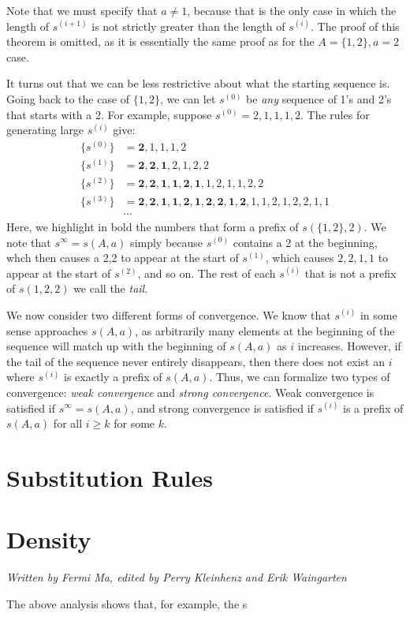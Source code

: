 \documentclass[runningheads,a4paper]{llncs}
\begin{document}
Note that we must specify that $a \neq 1$, because that is the only case in which the length of $s^{(i+1)}$ is not strictly greater than the length of $s^{(i)}$. The proof of this theorem is omitted, as it is essentially the same proof as for the $A = \{1,2\}, a = 2$ case.

It turns out that we can be less restrictive about what the starting sequence is. Going back to the case of $\{1,2\}$, we can let $s^{(0)}$ be \emph{any} sequence of 1's and 2's that starts with a 2. For example, suppose $s^{(0)} = 2,1,1,1,2$. The rules for generating large $s^{(i)}$ give:
\begin{align*}
\{s^{(0)}\} &= \mathbf{2},1,1,1,2\\
\{s^{(1)}\} &= \mathbf{2,2,1},2,1,2,2\\
\{s^{(2)}\} &= \mathbf{2,2,1,1,2,1},1,2,1,1,2,2\\
\{s^{(3)}\} &= \mathbf{2,2,1,1,2,1,2,2,1,2},1,1,2,1,2,2,1,1\\
&\cdots
\end{align*}
Here, we highlight in bold the numbers that form a prefix of $s(\{1,2\},2)$. We note that $s^\infty = s(A,a)$ simply because $s^{(0)}$ contains a 2 at the beginning, whch then causes a 2,2 to appear at the start of $s^{(1)}$, which causes $2,2,1,1$ to appear at the start of $s^{(2)}$, and so on. The rest of each $s^{(i)}$ that is not a prefix of $s({1,2},2)$ we call the \emph{tail}.

We now consider two different forms of convergence. We know that $s^{(i)}$ in some sense approaches $s(A,a)$, as arbitrarily many elements at the beginning of the sequence will match up with the beginning of $s(A,a)$ as $i$ increases. However, if the tail of the sequence never entirely disappears, then there does not exist an $i$ where $s^{(i)}$ is exactly a prefix of $s(A,a)$. Thus, we can formalize two types of convergence: \emph{weak convergence} and \emph{strong convergence}. Weak convergence is satisfied if $s^\infty = s(A,a)$, and strong convergence is satisfied if $s^{(i)}$ is a prefix of $s(A,a)$ for all $i \geq k$ for some $k$.

\section{Substitution Rules}
\label{substitutionrules}

\section{Density}
\label{density}

\emph{Written by Fermi Ma, edited by Perry Kleinhenz and Erik Waingarten}

The above analysis shows that, for example, the s
\end{document}
